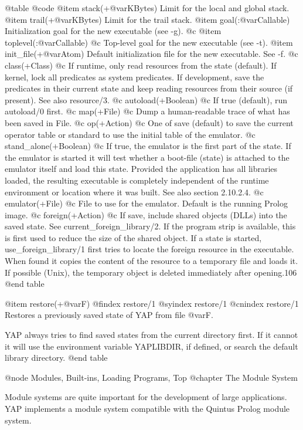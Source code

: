 {{{{@table @code
@item stack(+@var{KBytes})
Limit for the local and global stack.
@item trail(+@var{KBytes})
Limit for the trail stack.
@item goal(:@var{Callable})
Initialization goal for the new executable (see -g).
@c @item toplevel(:@var{Callable})
@c Top-level goal for the new executable (see -t).
@item init_file(+@var{Atom})
Default initialization file for the new executable. See -f.
@c class(+Class)
@c If runtime, only read resources from the state (default). If kernel, lock all predicates as system predicates. If development, save the predicates in their current state and keep reading resources from their source (if present). See also resource/3.
@c autoload(+Boolean)
@c If true (default), run autoload/0 first.
@c map(+File)
@c Dump a human-readable trace of what has been saved in File.
@c op(+Action)
@c One of save (default) to save the current operator table or standard to use the initial table of the emulator.
@c stand_alone(+Boolean)
@c If true, the emulator is the first part of the state. If the emulator is started it will test whether a boot-file (state) is attached to the emulator itself and load this state. Provided the application has all libraries loaded, the resulting executable is completely independent of the runtime environment or location where it was built. See also section 2.10.2.4.
@c emulator(+File)
@c File to use for the emulator. Default is the running Prolog image.
@c foreign(+Action)
@c If save, include shared objects (DLLs) into the saved state. See current_foreign_library/2. If the program strip is available, this is first used to reduce the size of the shared object. If a state is started, use_foreign_library/1 first tries to locate the foreign resource in the executable. When found it copies the content of the resource to a temporary file and loads it. If possible (Unix), the temporary object is deleted immediately after opening.106
@end table

@item restore(+@var{F})
@findex restore/1
@syindex restore/1
@cnindex restore/1
Restores a previously saved state of YAP from file @var{F}.

YAP always tries to find saved states from the current directory
first. If it cannot it will use the environment variable YAPLIBDIR, if
defined, or search the default library directory.
@end table


@node Modules, Built-ins, Loading Programs, Top
@chapter The Module System

Module systems are quite important for the development of large
applications. YAP implements a module system compatible with the Quintus
Prolog module system.

}}}}
